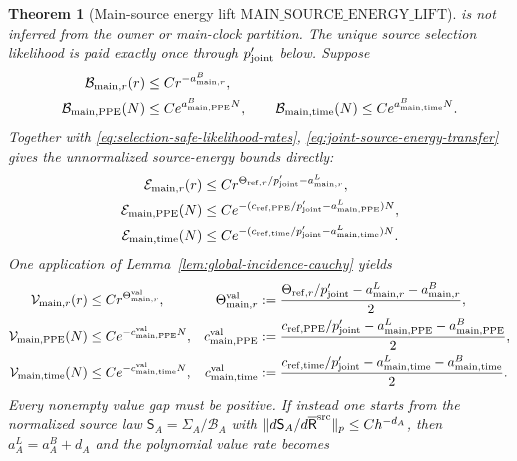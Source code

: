 \documentclass[11pt]{article}
\newtheorem{theorem}{Theorem}[section]
\begin{document}
\begin{theorem}[Main-source energy lift
$\mathrm{MAIN\_SOURCE\_ENERGY\_LIFT}$]
is not inferred from the owner or main-clock partition.  The unique source
selection likelihood is paid exactly once through $p_{\rm joint}'$ below.
Suppose
\begin{align}
\label{eq:main-source-base-mass}
 \mathcal B_{{\rm main},r}(r)&\le Cr^{-a_{{\rm main},r}^{B}},\notag\\
 \mathcal B_{{\rm main},{\rm PPE}}(N)
 &\le Ce^{a_{{\rm main},{\rm PPE}}^{B}N},\qquad
 \mathcal B_{{\rm main},{\rm time}}(N)
 \le Ce^{a_{{\rm main},{\rm time}}^{B}N}.
\end{align}
Together with \eqref{eq:selection-safe-likelihood-rates},
\eqref{eq:joint-source-energy-transfer} gives the \emph{unnormalized}
source-energy bounds directly:
\begin{align}
 \mathcal E_{{\rm main},r}(r)&\le
 Cr^{\Theta_{{\rm ref},r}/p_{\rm joint}'-a_{{\rm main},r}^{L}},\notag\\
 \mathcal E_{{\rm main},{\rm PPE}}(N)&\le
 Ce^{-(c_{{\rm ref},{\rm PPE}}/p_{\rm joint}'
       -a_{{\rm main},{\rm PPE}}^{L})N},\notag\\
 \mathcal E_{{\rm main},{\rm time}}(N)&\le
 Ce^{-(c_{{\rm ref},{\rm time}}/p_{\rm joint}'
       -a_{{\rm main},{\rm time}}^{L})N}.
 \label{eq:source-energy-bound}
\end{align}
One application of Lemma~\ref{lem:global-incidence-cauchy} yields
\begin{align}
 \mathcal V_{{\rm main},r}(r)&\le
 Cr^{\Theta_{{\rm main},r}^{\rm val}},&
 \Theta_{{\rm main},r}^{\rm val}&:=
 \frac{\Theta_{{\rm ref},r}/p_{\rm joint}'
             -a_{{\rm main},r}^{L}-a_{{\rm main},r}^{B}}2,\notag\\
 \mathcal V_{{\rm main},{\rm PPE}}(N)&\le
 Ce^{-c_{{\rm main},{\rm PPE}}^{\rm val}N},&
 c_{{\rm main},{\rm PPE}}^{\rm val}&:=
 \frac{c_{{\rm ref},{\rm PPE}}/p_{\rm joint}'
             -a_{{\rm main},{\rm PPE}}^{L}
             -a_{{\rm main},{\rm PPE}}^{B}}2,\notag\\
 \mathcal V_{{\rm main},{\rm time}}(N)&\le
 Ce^{-c_{{\rm main},{\rm time}}^{\rm val}N},&
 c_{{\rm main},{\rm time}}^{\rm val}&:=
 \frac{c_{{\rm ref},{\rm time}}/p_{\rm joint}'
             -a_{{\rm main},{\rm time}}^{L}
             -a_{{\rm main},{\rm time}}^{B}}2.
 \label{eq:source-value-small-ball}
\end{align}
Every nonempty value gap must be positive.  If instead one starts from the
normalized source law $\mathsf S_A=\Sigma_A/\mathcal B_A$ with
$\|d\mathsf S_A/d\overline{\mathsf R}^{\rm src}\|_p\le Ch^{-d_A}$, then
$a_A^{L}=a_A^{B}+d_A$ and the polynomial value rate becomes

\end{theorem}
\end{document}
